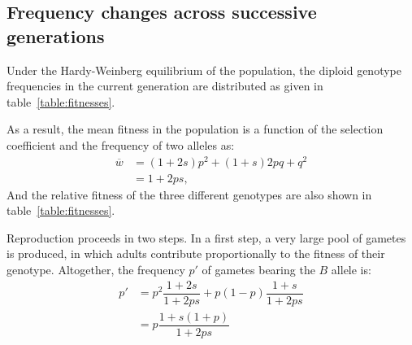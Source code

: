 \subsection{Frequency changes across successive generations}

Under the Hardy-Weinberg equilibrium of the population, the diploid genotype frequencies in the current generation are distributed as given in table~\ref{table:fitnesses}.

As a result, the mean fitness in the population is a function of the selection coefficient and the frequency of two alleles as:
\begin{align}
    \overline{w} &= (1+2s)p^2 + (1+s)2pq + q^2 \\
    &= 1 + 2ps,
\end{align}
And the relative fitness of the three different genotypes are also shown in table~\ref{table:fitnesses}.

\begin{table}[H]
    \centering
    \noindent{}
    \caption[Fitnesses of the different genotypes]{Fitnesses of the different genotypes}\label{table:fitnesses}
\end{table}

Reproduction proceeds in two steps.
In a first step, a very large pool of gametes is produced, in which adults contribute proportionally to the fitness of their genotype.
Altogether, the frequency $p'$ of gametes bearing the $B$ allele is:
\begin{align}
    p' & = p^2 \dfrac{1+2s}{1+2ps} + p(1-p)\dfrac{1+s}{1+2ps}\\
    & = p\dfrac{1+s(1+p)}{1 + 2ps}
\end{align}

